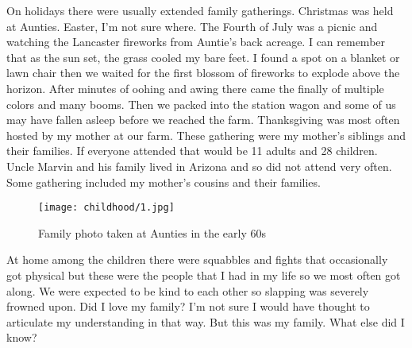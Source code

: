On holidays there were usually extended family gatherings.
Christmas was held at Aunties.
Easter, I'm not sure where.
The Fourth of July was a picnic and watching the Lancaster fireworks from Auntie's back acreage.
I can remember that as the sun set, the grass cooled my bare feet.
I found a spot on a blanket or lawn chair then we waited for the first blossom of fireworks to explode above the horizon.
After minutes of oohing and awing there came the finally of multiple colors and many booms.
Then we packed into the station wagon and some of us may have fallen asleep before we reached the farm.
Thanksgiving was most often hosted by my mother at our farm.
These gathering were my mother's siblings and their families.
If everyone attended that would be 11 adults and 28 children.
Uncle Marvin and his family lived in Arizona and so did not attend very often.
Some gathering included my mother's cousins and their families.
\begin{figure}
\centering
\texttt{[image: childhood/1.jpg]}
\caption{
Family photo taken at Aunties in the early 60s
}
\end{figure}

At home among the children there were squabbles and fights that occasionally got physical but these were the people that I had in my life so we most often got along.
We were expected to be kind to each other so slapping was severely frowned upon.
Did I love my family? I'm not sure I would have thought to articulate my understanding in that way.
But this was my family.
What else did I know?

